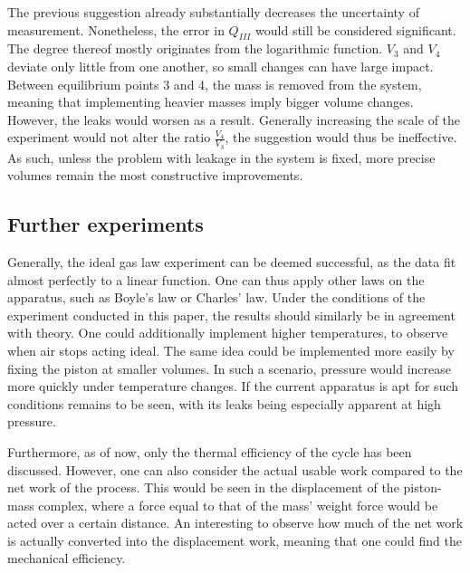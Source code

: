 The previous suggestion already substantially decreases the uncertainty of measurement. Nonetheless, the error in $\mathit{Q_{III}}$ would still be considered significant. The degree thereof mostly originates from the logarithmic function. $\mathit{V_3}$ and $\mathit{V_4}$ deviate only little from one another, so small changes can have large impact. Between equilibrium points 3 and 4, the mass is removed from the system, meaning that implementing heavier masses imply bigger volume changes. However, the leaks would worsen as a result. Generally increasing the scale of the experiment would not alter the ratio $\mathit{\frac{V_4}{V_3}}$, the suggestion would thus be ineffective. As such, unless the problem with leakage in the system is fixed, more precise volumes remain the most constructive improvements. 

\subsection{Further experiments}
\label{Further experiments}

Generally, the ideal gas law experiment can be deemed successful, as the data fit almost perfectly to a linear function. One can thus apply other laws on the apparatus, such as Boyle's law or Charles' law. Under the conditions of the experiment conducted in this paper, the results should similarly be in agreement with theory. One could additionally implement higher temperatures, to observe when air stops acting ideal. The same idea could be implemented more easily by fixing the piston at smaller volumes. In such a scenario, pressure would increase more quickly under temperature changes. If the current apparatus is apt for such conditions remains to be seen, with its leaks being especially apparent at high pressure. 

Furthermore, as of now, only the thermal efficiency of the cycle has been discussed. However, one can also consider the actual usable work compared to the net work of the process. This would be seen in the displacement of the piston-mass complex, where a force equal to that of the mass' weight force would be acted over a certain distance. An interesting to observe how much of the net work is actually converted into the displacement work, meaning that one could find the mechanical efficiency. 

